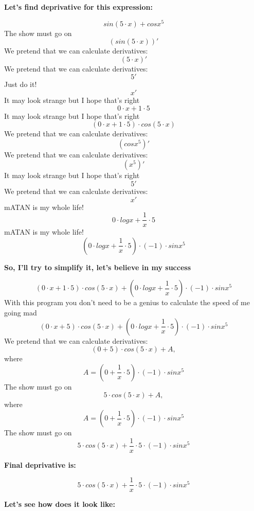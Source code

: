 \documentclass{article}
\begin{document}
\begin{flushleft}
{\bf Let's find deprivative for this expression:}
\end{flushleft}
$$sin\left(5 \cdot x\right)+cosx^5$$
The show must go on
$$\left(sin\left(5 \cdot x\right)\right)'$$
We pretend that we can calculate derivatives:
$$\left(5 \cdot x\right)'$$
We pretend that we can calculate derivatives:
$$5'$$
Just do it!
$$x'$$
It may look strange but I hope that's right
$$0 \cdot x+1 \cdot 5$$
It may look strange but I hope that's right
$$\left(0 \cdot x+1 \cdot 5\right) \cdot cos\left(5 \cdot x\right)$$
We pretend that we can calculate derivatives:
$$\left(cosx^5\right)'$$
We pretend that we can calculate derivatives:
$$\left(x^5\right)'$$
It may look strange but I hope that's right
$$5'$$
We pretend that we can calculate derivatives:
$$x'$$
mATAN is my whole life!
$$0 \cdot logx+\frac{1}{x} \cdot 5$$
mATAN is my whole life!
$$\left(0 \cdot logx+\frac{1}{x} \cdot 5\right) \cdot \left( -1 \right) \cdot sinx^5$$
\begin{flushleft}
{\bf So, I'll try to simplify it, let's believe in my success}
\end{flushleft}
$$\left(0 \cdot x+1 \cdot 5\right) \cdot cos\left(5 \cdot x\right)+\left(0 \cdot logx+\frac{1}{x} \cdot 5\right) \cdot \left( -1 \right) \cdot sinx^5$$
With this program you don't need to be a genius to calculate the speed of me going mad
$$\left(0 \cdot x+5\right) \cdot cos\left(5 \cdot x\right)+\left(0 \cdot logx+\frac{1}{x} \cdot 5\right) \cdot \left( -1 \right) \cdot sinx^5$$
We pretend that we can calculate derivatives:
$$\left(0+5\right) \cdot cos\left(5 \cdot x\right)+A, $$ where
$$A = \left(0+\frac{1}{x} \cdot 5\right) \cdot \left( -1 \right) \cdot sinx^5$$
The show must go on
$$5 \cdot cos\left(5 \cdot x\right)+A, $$ where
$$A = \left(0+\frac{1}{x} \cdot 5\right) \cdot \left( -1 \right) \cdot sinx^5$$
The show must go on
$$5 \cdot cos\left(5 \cdot x\right)+\frac{1}{x} \cdot 5 \cdot \left( -1 \right) \cdot sinx^5$$
\begin{flushleft}
{\bf Final deprivative is:}
\end{flushleft}
$$5 \cdot cos\left(5 \cdot x\right)+\frac{1}{x} \cdot 5 \cdot \left( -1 \right) \cdot sinx^5$$
\begin{flushleft}
{\bf Let's see how does it look like:}
\end{flushleft}
\end{document}
